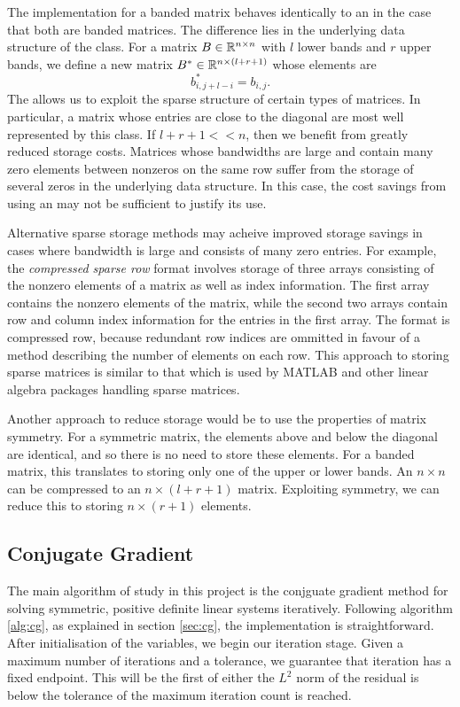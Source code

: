 The  implementation for a banded matrix behaves identically to an  in the case that both are banded matrices.
The difference lies in the underlying data structure of the class.
For a matrix $B\in\mathbb{R}^{n\times n}$ with $l$ lower bands and $r$ upper bands, we define a new matrix $B^*\in\mathbb{R}^{n \times (l+r+1)}$ whose elements are
\[
    b^*_{i,j+l-i} = b_{i,j}.
\]
The  allows us to exploit the sparse structure of certain types of matrices.
In particular, a matrix whose entries are close to the diagonal are most well represented by this class. 
If $l+r+1 << n$, then we benefit from greatly reduced storage costs.
Matrices whose bandwidths are large and contain many zero elements between nonzeros on the same row suffer from the storage of several zeros in the underlying data structure.
In this case, the cost savings from using an  may not be sufficient to justify its use.

Alternative sparse storage methods may acheive improved storage savings in cases where bandwidth is large and consists of many zero entries.
For example, the \textit{compressed sparse row} format involves storage of three arrays consisting of the nonzero elements of a matrix as well as index information.
The first array contains the nonzero elements of the matrix, while the second two arrays contain row and column index information for the entries in the first array.
The format is compressed row, because redundant row indices are ommitted in favour of a method describing the number of elements on each row.
This approach to storing sparse matrices is similar to that which is used by MATLAB and other linear algebra packages handling sparse matrices.

Another approach to reduce storage would be to use the properties of matrix symmetry. 
For a symmetric matrix, the elements above and below the diagonal are identical, and so there is no need to store these elements.
For a banded matrix, this translates to storing only one of the upper or lower bands.
An $n\times n$  can be compressed to an $n \times (l+r+1)$ matrix.
Exploiting symmetry, we can reduce this to storing $n \times (r+1)$ elements.


\subsection{Conjugate Gradient}

The main algorithm of study in this project is the conjguate gradient method for solving symmetric, positive definite linear systems iteratively.
Following algorithm \ref{alg:cg}, as explained in section \ref{sec:cg}, the implementation is straightforward.
After initialisation of the variables, we begin our iteration stage. 
Given a maximum number of iterations and a tolerance, we guarantee that iteration has a fixed endpoint.
This will be the first of either the $L^{2}$ norm of the residual is below the tolerance of the maximum iteration count is reached.


